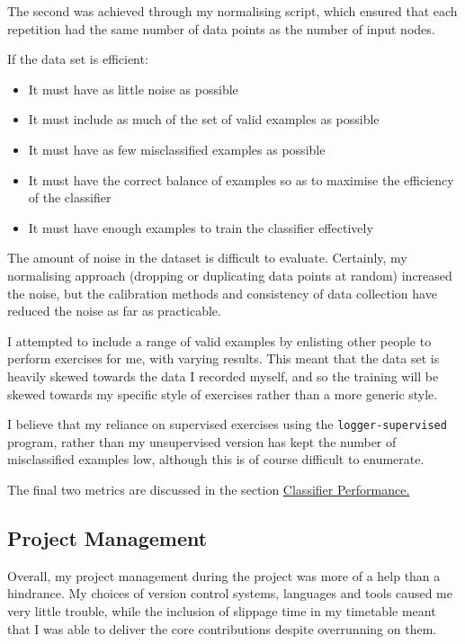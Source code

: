 \documentclass[a4paper]{article}
\begin{document}
The second was achieved through my normalising script, which ensured that each repetition had the same number of data points as the number of input nodes.

If the data set is efficient:

\begin{itemize}
\item It must have as little noise as possible
\item It must include as much of the set of valid examples as possible
\item It must have as few misclassified examples as possible
\item It must have the correct balance of examples so as to maximise the efficiency of the classifier
\item It must have enough examples to train the classifier effectively
\end{itemize}

The amount of noise in the dataset is difficult to evaluate. Certainly, my normalising approach (dropping or duplicating data points at random) increased the noise, but the calibration methods and consistency of data collection have reduced the noise as far as practicable.

I attempted to include a range of valid examples by enlisting other people to perform exercises for me, with varying results. This meant that the data set is heavily skewed towards the data I recorded myself, and so the training will be skewed towards my specific style of exercises rather than a more generic style.

I believe that my reliance on supervised exercises using the \lstinline{logger-supervised} program, rather than my unsupervised version has kept the number of misclassified examples low, although this is of course difficult to enumerate.

The final two metrics are discussed in the section \hyperref[subsec:ev_cp]{Classifier Performance.}

\newpage
\subsection{Project Management}%
\label{subsec:ev_pm}

Overall, my project management during the project was more of a help than a hindrance. My choices of version control systems, languages and tools caused me very little trouble, while the inclusion of slippage time in my timetable meant that I was able to deliver the core contributions despite overrunning on them.
\end{document}

